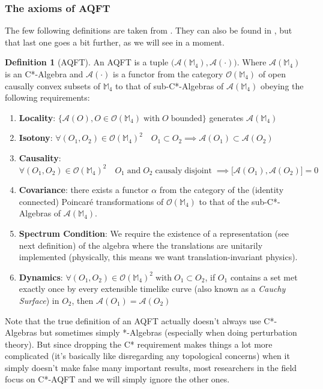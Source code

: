 \documentclass[a4paper,11pt]{article}
\numberwithin{equation}{section}
\theoremstyle{definition}
\newtheorem{definition}{Definition}
\begin{document}
\subsubsection{The axioms of AQFT}
The few following definitions are taken from \cite{AQFT_Intro}. They can also be found in \cite{pAQFT}, but that last one goes a bit further, as we will see in a moment.
\begin{definition}[AQFT] \label{AQFT_M4-Ax}
    An AQFT is a tuple $\big(\mathcal{A}(\mathbb{M}_4), \mathcal{A}(\cdot)\big)$. Where $\mathcal{A}(\mathbb{M}_4)$ is an C*-Algebra and $\mathcal{A}(\cdot)$ is a functor from the category $\mathcal{O}(\mathbb{M}_4)$ of open causally convex subsets of $\mathbb{M}_4$ to that of sub-C*-Algebras of $\mathcal{A}(\mathbb{M}_4)$ obeying the following requirements:
    \begin{enumerate}
        \item \textbf{Locality}:  $\big\{\mathcal{A}(O), O \in \mathcal{O}(\mathbb{M}_4) \; \mathrm{with}\; O\; \mathrm{bounded}\big\}$ generates $\mathcal{A}(\mathbb{M}_4)$
        \item \textbf{Isotony}: $\forall (O_1, O_2) \in \mathcal{O}(\mathbb{M}_4)^2 \quad O_1\subset O_2 \implies \mathcal{A}(O_1)\subset\mathcal{A}(O_2)$
        \item \textbf{Causality}: $\forall (O_1, O_2) \in \mathcal{O}(\mathbb{M}_4)^2 \quad O_1 \; \mathrm{and}\; O_2\; \mathrm{causaly}\;\mathrm{disjoint}\; \implies \big[\mathcal{A}(O_1),\mathcal{A}(O_2)\big]=0$
        \item \textbf{Covariance}: there exists a functor $\alpha$ from the category of the (identity connected) Poincaré transformations of $\mathcal{O}(\mathbb{M}_4)$ to that of the sub-C*-Algebras of $\mathcal{A}(\mathbb{M}_4)$.
        \item \textbf{Spectrum Condition}: We require the existence of a representation (see next definition) of the algebra where the translations are unitarily implemented (physically, this means we want translation-invariant physics).
        \item \textbf{Dynamics}: $\forall (O_1, O_2) \in \mathcal{O}(\mathbb{M}_4)^2 \;\mathrm{with} \;O_1 \subset O_2$, if $O_1$ contains a set met exactly once by every extensible timelike curve (also known as a \emph{Cauchy Surface}) in $O_2$, then $\mathcal{A}(O_1)=\mathcal{A}(O_2)$
    \end{enumerate}
Note that the true definition of an AQFT actually doesn't always use C*-Algebras but sometimes simply *-Algebras (especially when doing perturbation theory). But since dropping the C* requirement makes things a lot more complicated (it's basically like disregarding any topological concerns) when it simply doesn't make false many important results, most researchers in the field focus on C*-AQFT and we will simply ignore the other ones.
\end{definition}
\end{document}
